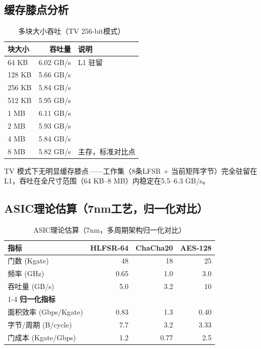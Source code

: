 \documentclass[11pt,a4paper]{ctexart}
\begin{document}
\subsection{缓存膝点分析}

\begin{table}[H]
\centering
\begin{tabular}{@{}lrl@{}}
\toprule
\textbf{块大小} & \textbf{吞吐量} & \textbf{说明} \\
\midrule
64 KB  & 6.02 GB/s & L1 驻留 \\
128 KB & 5.66 GB/s & \\
256 KB & 5.84 GB/s & \\
512 KB & 5.95 GB/s & \\
1 MB   & 6.11 GB/s & \\
2 MB   & 5.93 GB/s & \\
4 MB   & 5.84 GB/s & \\
8 MB   & 5.82 GB/s & 主存，标准对比点 \\
\bottomrule
\end{tabular}
\caption{多块大小吞吐（TV 256-bit模式）}
\label{tab:cache}
\end{table}

TV 模式下无明显缓存膝点——工作集（8条LFSR + 当前矩阵字节）完全驻留在L1，吞吐在全尺寸范围（64 KB--8 MB）内稳定在5.5--6.3 GB/s。

\subsection{ASIC理论估算（7nm工艺，归一化对比）}

\begin{table}[H]
\centering
\begin{tabular}{@{}lrrr@{}}
\toprule
\textbf{指标} & \textbf{HLFSR-64} & \textbf{ChaCha20} & \textbf{AES-128} \\
\midrule
门数 (Kgate)            & 48 & 18 & 25 \\
频率 (GHz)              & 0.65 & 1.0 & 3.0 \\
吞吐量 (GB/s)           & 5.0 & 3.2 & 10 \\
\cmidrule(lr){1-4}
\textbf{归一化指标} \\
\quad 面积效率 (Gbps/Kgate) & 0.83 & 1.3 & 0.40 \\
\quad 字节/周期 (B/cycle)   & 7.7 & 3.2 & 3.33 \\
\quad 门成本 (Kgate/Gbps)   & 1.2 & 0.77 & 2.5 \\
\bottomrule
\end{tabular}
\caption{ASIC理论估算（7nm，多周期架构归一化对比）}
\label{tab:asic}
\end{table}
\end{document}
